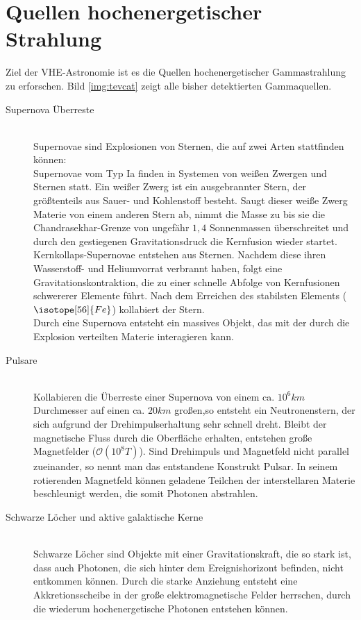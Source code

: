 \section{Quellen hochenergetischer Strahlung}
Ziel der VHE-Astronomie ist es die Quellen hochenergetischer Gammastrahlung zu erforschen. Bild \ref{img:tevcat} zeigt alle bisher detektierten Gammaquellen.
\begin{description}
\item[Supernova Überreste]\hfill \\
Supernovae sind Explosionen von Sternen, die auf zwei Arten stattfinden können:\\Supernovae vom Typ Ia finden in Systemen von weißen Zwergen und Sternen statt. Ein weißer Zwerg ist ein ausgebrannter Stern, der größtenteils aus Sauer- und Kohlenstoff besteht. Saugt dieser weiße Zwerg Materie von einem anderen Stern ab, nimmt die Masse zu bis sie die Chandrasekhar-Grenze von ungefähr $1,4$ Sonnenmassen \cite{Grupen} überschreitet und durch den gestiegenen Gravitationsdruck die Kernfusion wieder startet.\\Kernkollaps-Supernovae entstehen aus Sternen. Nachdem diese ihren Wasserstoff- und Heliumvorrat verbrannt haben, folgt eine Gravitationskontraktion, die zu einer schnelle Abfolge von Kernfusionen schwererer Elemente führt. Nach dem Erreichen des stabilsten Elements ($\isotope[56]{Fe}$) kollabiert der Stern.\\Durch eine Supernova entsteht ein massives Objekt, das mit der durch die Explosion verteilten Materie interagieren kann.
\item[Pulsare]\hfill \\
Kollabieren die Überreste einer Supernova von einem ca. $10^6\unit{km}$ Durchmesser auf einen ca. $20\unit{km}$ großen,so entsteht ein Neutronenstern, der sich aufgrund der Drehimpulserhaltung sehr schnell dreht. Bleibt der magnetische Fluss durch die Oberfläche erhalten, entstehen große Magnetfelder ($\mathcal{O}(10^8\unit{T})$\cite{Grupen}). Sind Drehimpuls und Magnetfeld nicht parallel zueinander, so nennt man das entstandene Konstrukt Pulsar. In seinem rotierenden Magnetfeld können geladene Teilchen der interstellaren Materie beschleunigt werden, die somit Photonen abstrahlen.
\item[Schwarze Löcher und aktive galaktische Kerne]\hfill \\
Schwarze Löcher sind Objekte mit einer Gravitationskraft, die so stark ist, dass auch Photonen, die sich hinter dem Ereignishorizont befinden, nicht entkommen können. Durch die starke Anziehung entsteht eine Akkretionsscheibe in der große elektromagnetische Felder herrschen, durch die wiederum hochenergetische Photonen entstehen können.

\end{description}
